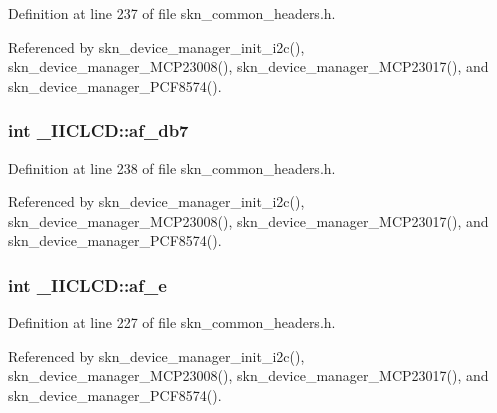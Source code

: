 Definition at line 237 of file skn\+\_\+common\+\_\+headers.\+h.



Referenced by skn\+\_\+device\+\_\+manager\+\_\+init\+\_\+i2c(), skn\+\_\+device\+\_\+manager\+\_\+\+M\+C\+P23008(), skn\+\_\+device\+\_\+manager\+\_\+\+M\+C\+P23017(), and skn\+\_\+device\+\_\+manager\+\_\+\+P\+C\+F8574().

\hypertarget{struct___i_i_c_l_c_d_ae55385ca612fd157fb85e7b3d5423ee4}{}
\subsubsection[{af\+\_\+db7}]{\setlength{\rightskip}{0pt plus 5cm}int \+\_\+\+I\+I\+C\+L\+C\+D\+::af\+\_\+db7}\label{struct___i_i_c_l_c_d_ae55385ca612fd157fb85e7b3d5423ee4}


Definition at line 238 of file skn\+\_\+common\+\_\+headers.\+h.



Referenced by skn\+\_\+device\+\_\+manager\+\_\+init\+\_\+i2c(), skn\+\_\+device\+\_\+manager\+\_\+\+M\+C\+P23008(), skn\+\_\+device\+\_\+manager\+\_\+\+M\+C\+P23017(), and skn\+\_\+device\+\_\+manager\+\_\+\+P\+C\+F8574().

\hypertarget{struct___i_i_c_l_c_d_a896f8305b5c0395ea7f9074904047b32}{}
\subsubsection[{af\+\_\+e}]{\setlength{\rightskip}{0pt plus 5cm}int \+\_\+\+I\+I\+C\+L\+C\+D\+::af\+\_\+e}\label{struct___i_i_c_l_c_d_a896f8305b5c0395ea7f9074904047b32}


Definition at line 227 of file skn\+\_\+common\+\_\+headers.\+h.



Referenced by skn\+\_\+device\+\_\+manager\+\_\+init\+\_\+i2c(), skn\+\_\+device\+\_\+manager\+\_\+\+M\+C\+P23008(), skn\+\_\+device\+\_\+manager\+\_\+\+M\+C\+P23017(), and skn\+\_\+device\+\_\+manager\+\_\+\+P\+C\+F8574().

\hypertarget{struct___i_i_c_l_c_d_a70176d63c9065d4186f55ae8328a82d3}{}

